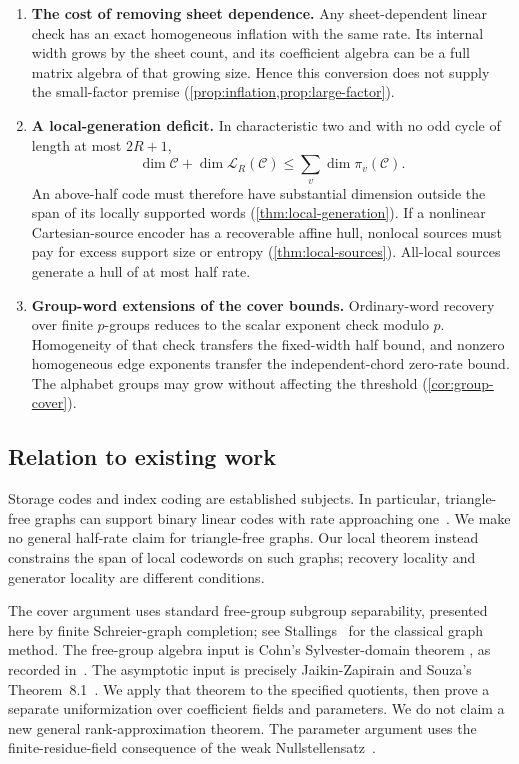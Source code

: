 \begin{enumerate}[label=\textup{(\arabic*)}]
\item \textbf{The cost of removing sheet dependence.}
Any sheet-dependent linear check has an exact homogeneous inflation
with the same rate. Its internal width grows by the sheet count, and
its coefficient algebra can be a full matrix algebra of that growing
size. Hence this conversion does not supply the small-factor premise
(\cref{prop:inflation,prop:large-factor}).
\item \textbf{A local-generation deficit.}
In characteristic two and with no odd cycle of length at most $2R+1$,
\[
 \dim\mathcal C+\dim\mathcal L_R(\mathcal C)
       \le\sum_v\dim\pi_v(\mathcal C).
\]
An above-half code must therefore have substantial dimension outside
the span of its locally supported words (\cref{thm:local-generation}).
If a nonlinear Cartesian-source encoder has a recoverable affine hull,
nonlocal sources must pay for excess support size or entropy
(\cref{thm:local-sources}). All-local sources generate a hull of at
most half rate.
\item \textbf{Group-word extensions of the cover bounds.}
Ordinary-word recovery over finite $p$-groups reduces to the scalar
exponent check modulo $p$. Homogeneity of that check transfers the
fixed-width half bound, and nonzero homogeneous edge exponents transfer
the independent-chord zero-rate bound. The alphabet groups may grow
without affecting the threshold (\cref{cor:group-cover}).
\end{enumerate}

\subsection{Relation to existing work}
Storage codes and index coding are established subjects. In particular,
triangle-free graphs can support binary linear codes with rate approaching
one~\cite{BargZemor,BargSchwartzYohananov,Zabokritskiy}.
We make no general half-rate claim for triangle-free graphs. Our local
theorem instead constrains the span of local codewords on such graphs;
recovery locality and generator locality are different conditions.

The cover argument uses standard free-group subgroup separability,
presented here by finite Schreier-graph completion; see
Stallings~\cite{Stallings} for the classical graph method. The
free-group algebra input is Cohn's Sylvester-domain theorem
\cite{Cohn}, as recorded in~\cite[Introduction]{JaikinSouza}.
The asymptotic input is precisely Jaikin-Zapirain and Souza's
Theorem~8.1~\cite{JaikinSouza}. We apply that theorem to the specified
quotients, then prove a separate uniformization over coefficient fields
and parameters. We do not claim a new general rank-approximation theorem.
The parameter argument uses the finite-residue-field consequence of the
weak Nullstellensatz~\cite{Stacks00FV}.

